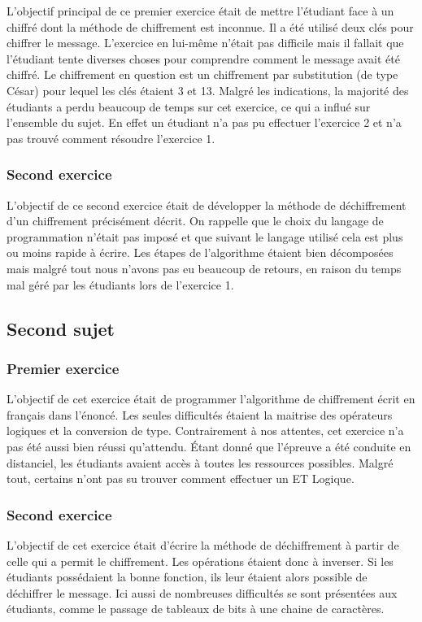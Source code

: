 \documentclass[12pt]{article}
\begin{document}

L'objectif principal de ce premier exercice était de mettre l'étudiant face à un chiffré dont la méthode de chiffrement est inconnue. Il a été utilisé deux clés pour chiffrer le message. L'exercice en lui-même n'était pas difficile mais il fallait que l'étudiant tente diverses choses pour comprendre comment le message avait été chiffré. Le chiffrement en question est un chiffrement par substitution (de type César) pour lequel les clés étaient \textsf{3} et \textsf{13}. Malgré les indications, la majorité des étudiants a perdu beaucoup de temps sur cet exercice, ce qui a influé sur l'ensemble du sujet. En effet un étudiant n'a pas pu effectuer l'exercice 2 et n'a pas trouvé comment résoudre l'exercice 1.


\subsubsection{Second exercice}

L'objectif de ce second exercice était de développer la méthode de déchiffrement d'un chiffrement précisément décrit. On rappelle que le choix du langage de programmation n'était pas imposé et que suivant le langage utilisé cela est plus ou moins rapide à écrire. Les étapes de l'algorithme étaient bien décomposées mais malgré tout nous n'avons pas eu beaucoup de retours, en raison du temps mal géré par les étudiants lors de l'exercice 1.

\pagebreak

\subsection{Second sujet}
\subsubsection{Premier exercice}
L'objectif de cet exercice était de programmer l'algorithme de chiffrement écrit en français dans l'énoncé. Les seules difficultés étaient la maitrise des opérateurs logiques et la conversion de type. Contrairement à nos attentes, cet exercice n'a pas été aussi bien réussi qu'attendu. Étant donné que l'épreuve a été conduite en distanciel, les étudiants avaient accès à toutes les ressources possibles. Malgré tout, certains n'ont pas su trouver comment effectuer un \textsf{ET Logique}.

\subsubsection{Second exercice}
L'objectif de cet exercice était d'écrire la méthode de déchiffrement à partir de celle qui a permit le chiffrement. Les opérations étaient donc à inverser. Si les étudiants possédaient la bonne fonction, ils leur étaient alors possible de déchiffrer le message. Ici aussi de nombreuses difficultés se sont présentées aux étudiants, comme le passage de tableaux de bits à une chaine de caractères.
\end{document}
